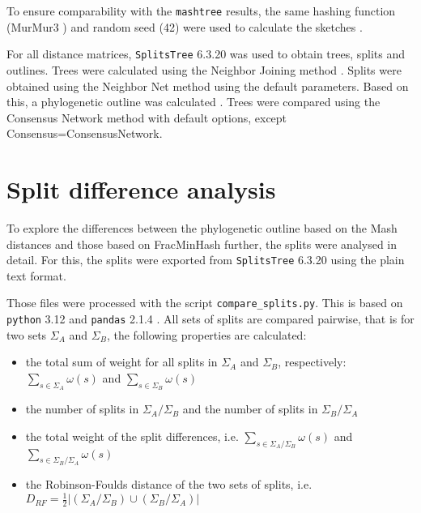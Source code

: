 To ensure comparability with the \texttt{mashtree} results, the same hashing
function (MurMur3 \cite{applebyAapplebySmhasher,ZeroAllocationHashing2022}) and
random seed (42) were used to calculate the sketches
\cite{katzMashtreeRapidComparison2019,ondovMashFastGenome2016}.

For all distance matrices, \texttt{SplitsTree} 6.3.20
\cite{husonApplicationPhylogeneticNetworks2006} was used to obtain trees, splits
and outlines. Trees were calculated using the Neighbor Joining method
\cite{saitouNeighborjoiningMethodNew1987}. Splits were obtained using the
Neighbor Net method
\cite{bryantNeighborNetAgglomerativeMethod2004,bryantNeighborNetImprovedAlgorithms2023}
using the default parameters. Based on this, a phylogenetic outline was
calculated \cite{bagciMicrobialPhylogeneticContext2021}. Trees were compared
using  the Consensus Network method \cite{hollandUsingConsensusNetworks2004}
with default options, except Consensus=ConsensusNetwork.



\section{Split difference analysis}
\label{sec:splitanalysis}
To explore the differences between the phylogenetic outline based on the Mash
distances and those based on FracMinHash further, the splits were analysed in
detail. For this, the splits were exported from \texttt{SplitsTree} 6.3.20
\cite{husonApplicationPhylogeneticNetworks2006} using the plain text format.

Those files were processed with the script \texttt{compare\_splits.py}. This is
based on \texttt{python} 3.12 \cite{vanrossumPythonReferenceManual2009} and
\texttt{pandas} 2.1.4
\cite{PandasdevPandasPandas2024,mckinneyDataStructuresStatistical2010}. All sets
of splits are compared pairwise, that is for two sets $\Sigma_A$ and $\Sigma_B$,
the following properties are calculated:

\begin{itemize}
  \item the total sum of weight for all splits in $\Sigma_A$ and $\Sigma_B$,
  respectively: $\sum_{s \in \Sigma_A}{\omega(s)}$ and $\sum_{s \in
  \Sigma_B}{\omega(s)}$ 
  \item the number of splits in $\Sigma_A / \Sigma_B$ and the number of splits
  in $\Sigma_B / \Sigma_A$
  \item the total weight of the split differences, i.e.
  $\sum_{s \in \Sigma_A / \Sigma_B}{\omega(s)}$ and $\sum_{s \in \Sigma_B /
  \Sigma_A}{\omega(s)}$
  \item the Robinson-Foulds distance
  \cite{robinsonComparisonPhylogeneticTrees1981} of the two sets of splits, i.e.
  $D_{RF} = \frac{1}{2}|(\Sigma_A / \Sigma_B) \cup (\Sigma_B / \Sigma_A)|$
\end{itemize}

